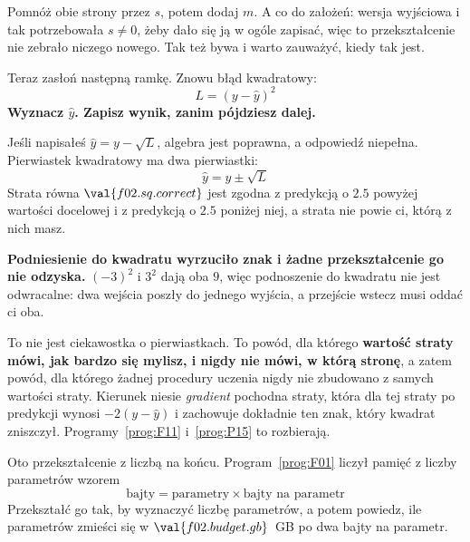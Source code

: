 \begin{fr}
Pomnóż obie strony przez $s$, potem dodaj $m$. A co do założeń: wersja
wyjściowa i tak potrzebowała $s \ne 0$, żeby dało się ją w ogóle zapisać, więc
to przekształcenie nie zebrało niczego nowego. Tak też bywa i warto zauważyć,
kiedy tak jest.

Teraz zasłoń następną ramkę. Znowu błąd kwadratowy:
\[ L = (y - \hat{y})^{2} \]
\textbf{Wyznacz $\hat{y}$. Zapisz wynik, zanim pójdziesz dalej.}
\dotline
\nextframe
\end{fr}

\begin{fr}
\begin{ansblock}
Jeśli napisałeś $\hat{y} = y - \sqrt{L}$, algebra jest poprawna, a odpowiedź
niepełna. Pierwiastek kwadratowy ma dwa pierwiastki:
\[ \hat{y} = y \pm \sqrt{L} \]
Strata równa $\val{f02.sq.correct}$ jest zgodna z predykcją o $\num{2.5}$
powyżej wartości docelowej i z predykcją o $\num{2.5}$ poniżej niej, a strata
nie powie ci, którą z nich masz.
\end{ansblock}

\begin{trapbox}
\textbf{Podniesienie do kwadratu wyrzuciło znak i żadne przekształcenie go nie
odzyska.} $(-3)^{2}$ i $3^{2}$ dają oba $9$, więc podnoszenie do kwadratu nie
jest odwracalne: dwa wejścia poszły do jednego wyjścia, a przejście wstecz musi
oddać ci oba.

To nie jest ciekawostka o pierwiastkach. To powód, dla którego \textbf{wartość
straty mówi, jak bardzo się mylisz, i nigdy nie mówi, w którą stronę}, a zatem
powód, dla którego żadnej procedury uczenia nigdy nie zbudowano z samych
wartości straty. Kierunek niesie \emph{gradient} \dash{} pochodna straty, która
dla tej straty po predykcji wynosi $-2(y - \hat{y})$ i zachowuje dokładnie ten
znak, który kwadrat zniszczył. Programy~\ref{prog:F11} i~\ref{prog:P15} to
rozbierają.
\end{trapbox}
Oto przekształcenie z liczbą na końcu. Program~\ref{prog:F01} liczył pamięć z
liczby parametrów wzorem
\[ \text{bajty} = \text{parametry} \times \text{bajty na parametr} \]
Przekształć go tak, by wyznaczyć liczbę parametrów, a potem powiedz, ile
parametrów zmieści się w $\val{f02.budget.gb}$~GB po dwa bajty na parametr.
\dotline
\nextframe
\end{fr}

